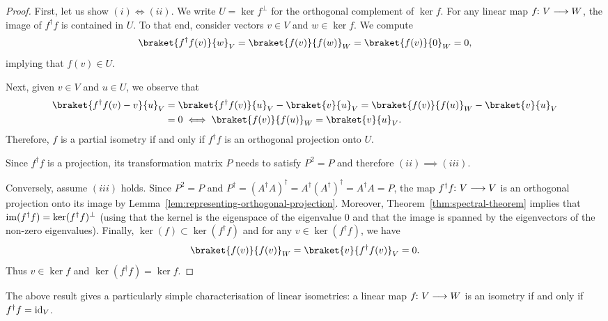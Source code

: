 \documentclass[a4paper, oneside, 12pt]{amsart}
\begin{document}
\begin{proof}
  First, let us show \((i) \iff (ii)\).
  We write \(U = \ker f^{\perp}\) for the orthogonal complement of \(\ker f\).
  For any linear map \(f\from V \to W\), the image of \(f^{\dagger}f\) is contained in \(U\).
  To that end, consider  vectors \(v\in V\) and \(w \in \ker f\).
  We compute
  \begin{equation*}
    \braket{f^{\dagger}f(v)}{w}_{V}
    = \braket{f(v) }{ f(w)}_{W}
    = \braket{f(v) }{ 0 }_{W}
    = 0,
  \end{equation*}
  implying that \(f(v) \in U\).

  Next, given \(v \in V\) and \(u\in U\), we observe that
  \begin{align*}
    \braket{f^{\dagger}f(v) - v}{u}_{V}
    & = \braket{f^{\dagger}f(v)}{u}_{V} - \braket{v}{u}_{V}
      = \braket{f(v)}{f(u)}_{W} - \braket{v}{u}_{V} \\
    & = 0 \iff \braket{f(v)}{f(u)}_{W}
      = \braket{v}{u}_{V}.
  \end{align*}
  Therefore, \(f\) is a partial isometry if and only if \(f^{\dagger}f\) is an orthogonal projection onto \(U\).
  \medskip

  Since \(f^{\dagger} f\) is a projection, its transformation matrix \(P\) needs to satisfy \(P^{2} = P\) and therefore \((ii) \implies (iii)\).
  \medskip

  Conversely, assume \((iii)\) holds.
  Since \(P^{2} = P\) and \(P^{\dagger} = (A^{\dagger} A)^{\dagger} = A^{\dagger}(A^{\dagger})^{\dagger} = A^{\dagger} A = P\), the map \(f^{\dagger} f \from V\to V\) is an orthogonal projection onto its image by Lemma~\ref{lem:representing-orthogonal-projection}.
  Moreover, Theorem~\ref{thm:spectral-theorem} implies that \(\operatorname{im} (f^{\dagger} f) = \operatorname{ker}(f^{\dagger} f)^{\perp}\) (using that the kernel is the eigenspace of the eigenvalue \(0\) and that the image is spanned by the eigenvectors of the non-zero eigenvalues).
  Finally, \(\ker (f) \subset \ker(f^{\dagger} f)\) and for any  \(v\in \ker (f^{\dagger} f)  \), we have
  \begin{equation*}
    \braket{f(v)}{f(v)}_{W} = \braket{v}{f^{\dagger}f(v)}_{V} = 0.
  \end{equation*}
  Thus \(v \in \ker f\) and \(\ker(f^{\dagger} f) = \ker f \).
\end{proof}


\begin{remark}\label{rmk:isometries-vs-partial-isometries}
  The above result gives a particularly simple characterisation of linear isometries:
  a linear map \(f \from V \to W\) is an isometry if and only if \(f^{\dagger} f =\mathrm{id}_{V}\).
\end{remark}
\end{document}
